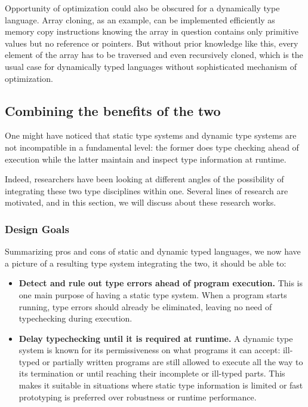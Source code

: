 Opportunity of optimization could also be obscured for a dynamically type language.
Array cloning, as an example,
can be implemented efficiently as memory copy instructions
knowing the array in question contains only primitive values but no reference or pointers.
But without prior knowledge like this,
every element of the array has to be traversed and even recursively cloned,
which is the usual case for dynamically typed languages without sophisticated mechanism
of optimization.

\subsection{Combining the benefits of the two}

One might have noticed that static type systems and dynamic type systems
are not incompatible in a fundamental level:
the former does type checking ahead of execution while
the latter maintain and inspect type information at runtime.

Indeed, researchers have been looking at different angles of
the possibility of integrating these two type disciplines within one.
Several lines of research are motivated,
and in this section, we will discuss about these research works.

\subsubsection{Design Goals}

Summarizing pros and cons of static and dynamic typed languages,
we now have a picture of a resulting type system integrating the two,
it should be able to:

\begin{itemize}
	\item \textbf{Detect and rule out type errors ahead of program execution.}
	This is one main purpose of having a static type system.
	When a program starts running, type errors should already be eliminated,
	leaving no need of typechecking during execution.
	\item \textbf{Delay typechecking until it is required at runtime.}
	A dynamic type system is known for its permissiveness on what programs it can accept:
	ill-typed or partially written programs are still allowed to execute
	all the way to its termination or until reaching their incomplete or ill-typed parts.
	This makes it suitable in situations where static type information
	is limited or fast prototyping is preferred over robustness or runtime performance.
\end{itemize}

